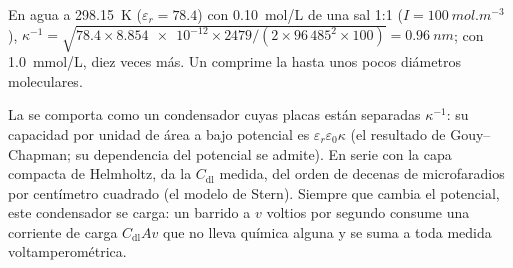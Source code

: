 \begin{example}\label{ex:b3:electrode-kinetics:debye}
En agua a \qty{298.15}{K} ($\varepsilon_r = 78.4$) con \qty{0.10}{mol/L} de una sal 1:1 ($I = \qty{100}{mol.m^{-3}}$),
$\kappa^{-1} = \sqrt{78.4 \times \num{8.854e-12} \times 2479/(2 \times 96\,485^2 \times 100)} = \qty{0.96}{nm}$; con \qty{1.0}{mmol/L},
diez veces más. Un  comprime la  hasta unos pocos
diámetros moleculares.
\end{example}

La  se comporta como un condensador cuyas placas están separadas $\kappa^{-1}$: su
capacidad por unidad de área a bajo potencial es $\varepsilon_r\varepsilon_0\kappa$ (el resultado de
Gouy--Chapman; su dependencia del potencial se admite). En serie con la
capa compacta de Helmholtz, da la $C_{\mathrm{dl}}$ medida, del orden de decenas de
microfaradios por centímetro cuadrado (el modelo de Stern). Siempre que cambia el potencial, este condensador
se carga: un barrido a $v$ voltios por segundo consume una corriente de carga $C_{\mathrm{dl}}Av$ que
no lleva química alguna y se suma a toda medida voltamperométrica.

